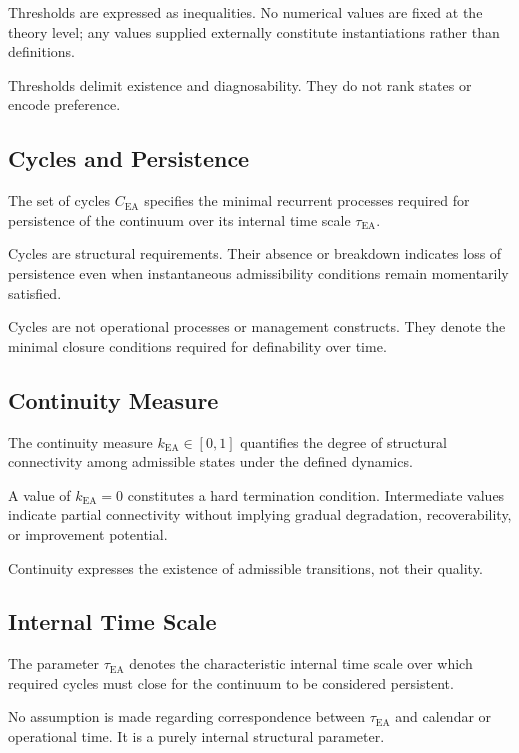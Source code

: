Thresholds are expressed as inequalities.
No numerical values are fixed at the theory level; any values supplied
externally constitute instantiations rather than definitions.

Thresholds delimit existence and diagnosability.
They do not rank states or encode preference.

\subsection{Cycles and Persistence}

The set of cycles $C_{\mathrm{EA}}$ specifies the minimal recurrent
processes required for persistence of the continuum over its internal
time scale $\tau_{\mathrm{EA}}$.

Cycles are structural requirements.
Their absence or breakdown indicates loss of persistence even when
instantaneous admissibility conditions remain momentarily satisfied.

Cycles are not operational processes or management constructs.
They denote the minimal closure conditions required for definability
over time.

\subsection{Continuity Measure}

The continuity measure $k_{\mathrm{EA}} \in [0,1]$ quantifies the degree
of structural connectivity among admissible states under the defined
dynamics.

A value of $k_{\mathrm{EA}} = 0$ constitutes a hard termination
condition.
Intermediate values indicate partial connectivity without implying
gradual degradation, recoverability, or improvement potential.

Continuity expresses the existence of admissible transitions, not their
quality.

\subsection{Internal Time Scale}

The parameter $\tau_{\mathrm{EA}}$ denotes the characteristic internal
time scale over which required cycles must close for the continuum to be
considered persistent.

No assumption is made regarding correspondence between
$\tau_{\mathrm{EA}}$ and calendar or operational time.
It is a purely internal structural parameter.

